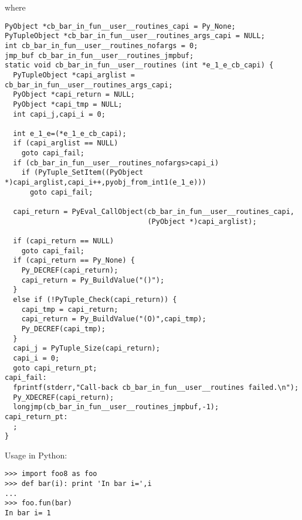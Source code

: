 \documentclass{article}
\begin{document}
where
\begin{verbatim}
PyObject *cb_bar_in_fun__user__routines_capi = Py_None;
PyTupleObject *cb_bar_in_fun__user__routines_args_capi = NULL;
int cb_bar_in_fun__user__routines_nofargs = 0;
jmp_buf cb_bar_in_fun__user__routines_jmpbuf;
static void cb_bar_in_fun__user__routines (int *e_1_e_cb_capi) {
  PyTupleObject *capi_arglist = cb_bar_in_fun__user__routines_args_capi;
  PyObject *capi_return = NULL;
  PyObject *capi_tmp = NULL;
  int capi_j,capi_i = 0;

  int e_1_e=(*e_1_e_cb_capi);
  if (capi_arglist == NULL)
    goto capi_fail;
  if (cb_bar_in_fun__user__routines_nofargs>capi_i)
    if (PyTuple_SetItem((PyObject *)capi_arglist,capi_i++,pyobj_from_int1(e_1_e)))
      goto capi_fail;

  capi_return = PyEval_CallObject(cb_bar_in_fun__user__routines_capi,
                                  (PyObject *)capi_arglist);

  if (capi_return == NULL)
    goto capi_fail;
  if (capi_return == Py_None) {
    Py_DECREF(capi_return);
    capi_return = Py_BuildValue("()");
  }
  else if (!PyTuple_Check(capi_return)) {
    capi_tmp = capi_return;
    capi_return = Py_BuildValue("(O)",capi_tmp);
    Py_DECREF(capi_tmp);
  }
  capi_j = PyTuple_Size(capi_return);
  capi_i = 0;
  goto capi_return_pt;
capi_fail:
  fprintf(stderr,"Call-back cb_bar_in_fun__user__routines failed.\n");
  Py_XDECREF(capi_return);
  longjmp(cb_bar_in_fun__user__routines_jmpbuf,-1);
capi_return_pt:
  ;
}
\end{verbatim}
Usage in Python:
\begin{verbatim}
>>> import foo8 as foo
>>> def bar(i): print 'In bar i=',i
...
>>> foo.fun(bar)
In bar i= 1
\end{verbatim}
\end{document}
